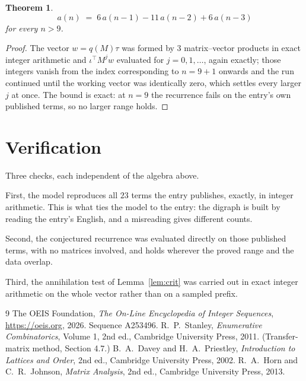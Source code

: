 \documentclass[11pt,a4paper]{article}
\theoremstyle{plain}
\newtheorem{theorem}{Theorem}
\theoremstyle{definition}
\begin{document}
\begin{theorem}
\[
a(n)\;=\;6\,a(n-1) - 11\,a(n-2) + 6\,a(n-3)
\]
for every $n>9$.
\end{theorem}

\begin{proof}
The vector $w=q(M)\tau$ was formed by $3$ matrix--vector products in exact integer
arithmetic and $\iota^{\!\top}M^{j}w$ evaluated for $j=0,1,\dots$, again exactly; those
integers vanish from the index corresponding to $n=9+1$ onwards and the run continued
until the working vector was identically zero, which settles every larger $j$ at once. The bound is exact: at $n=9$ the recurrence fails on the entry's own published terms, so no larger range holds.
\end{proof}

\section{Verification}

Three checks, each independent of the algebra above.

First, the model reproduces all $23$ terms the entry publishes, exactly, in integer
arithmetic. This is what ties the model to the entry: the digraph is built by reading the
entry's English, and a misreading gives different counts.

Second, the conjectured recurrence was evaluated directly on those published terms, with no
matrices involved, and holds wherever the proved range and the data overlap.

Third, the annihilation test of Lemma~\ref{lem:crit} was carried out in exact integer
arithmetic on the whole vector rather than on a sampled prefix.

\begin{thebibliography}{9}
 The OEIS Foundation, \emph{The On-Line Encyclopedia of Integer
Sequences}, \url{https://oeis.org}, 2026. Sequence A253496.
 R.~P.~Stanley, \emph{Enumerative Combinatorics}, Volume 1, 2nd ed.,
Cambridge University Press, 2011. (Transfer-matrix method, Section 4.7.)
 B.~A.~Davey and H.~A.~Priestley, \emph{Introduction to Lattices and
Order}, 2nd ed., Cambridge University Press, 2002.
 R.~A.~Horn and C.~R.~Johnson, \emph{Matrix Analysis}, 2nd ed., Cambridge
University Press, 2013.
\end{thebibliography}
\end{document}
